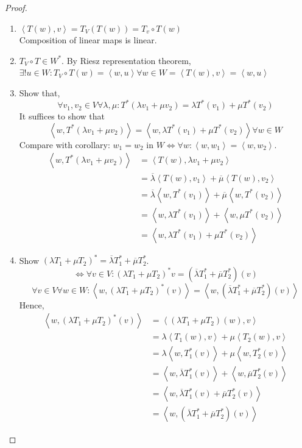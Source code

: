 \documentclass{article}
\newcommand{\ip}[2]{\left\langle#1,#2\right\rangle} %
\begin{document}
\begin{proof}
  \begin{enumerate}
    \item $\ip{T(w)}{v} = T_V(T(w)) = T_v \circ T(w)$ \\
      Composition of linear maps is linear.
    \item $T_V \circ T \in W^*$. By Riesz representation theorem, $\exists! u \in W: T_V \circ T(w) = \ip{w}{u} \forall w \in W = \ip{T(w)}{v} = \ip wu$
    \item Show that,
      \[ \forall v_1, v_2 \in V \forall \lambda, \mu: T^*(\lambda v_1 + \mu v_2) = \lambda T^*(v_1) + \mu T^*(v_2) \]
      It suffices to show that
      \[ \ip{w}{T^*(\lambda v_1 + \mu v_2)} = \ip{w}{\lambda T^*(v_1) + \mu T^*(v_2)} \forall w \in W \]
      Compare with corollary: $w_1 = w_2$ in $W \iff \forall w: \ip{w}{w_1} = \ip{w}{w_2}$.
      \begin{align*}
        \ip{w}{T^*(\lambda v_1 + \mu v_2)} &= \ip{T(w)}{\lambda v_1 + \mu v_2} \\
          &= \overline{\lambda} \ip{T(w)}{v_1} + \overline{\mu} \ip{T(w)}{v_2} \\
          &= \overline{\lambda} \ip{w}{T^*(v_1)} + \overline{\mu} \ip{w}{T^*(v_2)} \\
          &= \ip{w}{\lambda T^*(v_1)} + \ip{w}{\mu T^*(v_2)} \\
          &= \ip{w}{\lambda T^*(v_1) + \mu T^*(v_2)}
      \end{align*}
    \item Show $(\lambda T_1 + \mu T_2)^* = \overline{\lambda} T_1^* + \overline{\mu} T_2^*$. \\
      \[ \iff \forall v \in V: (\lambda T_1 + \mu T_2)^* v = (\overline{\lambda} T_1^* + \overline{\mu} T_2^*)(v) \]
      \[ \forall v \in V \forall w \in W: \ip{w}{(\lambda T_1 + \mu T_2)^*(v)} = \ip{w}{(\overline{\lambda} T_1^* + \overline{\mu} T_2^*)(v)} \]
      Hence,
      \begin{align*}
        \ip{w}{(\lambda T_1 + \mu T_2)^*(v)}
          &= \ip{(\lambda T_1 + \mu T_2)(w)}{v} \\
          &= \lambda \ip{T_1(w)}{v} + \mu\ip{T_2(w)}{v} \\
          &= \lambda \ip{w}{T_1^*(v)} + \mu \ip{w}{T_2^*(v)} \\
          &= \ip{w}{\overline{\lambda} T_1^*(v)} + \ip{w}{\overline{\mu} T_2^*(v)} \\
          &= \ip{w}{\overline{\lambda} T_1^*(v) + \overline{\mu} T_2^*(v)} \\
          &= \ip{w}{(\overline\lambda T_1^* + \overline\mu T_2^*)(v)}
      \end{align*}


\end{enumerate}
\end{proof}
\end{document}
